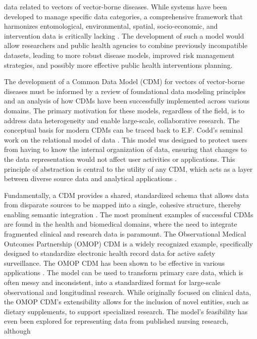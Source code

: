 \documentclass{article}
\begin{document}
data related to vectors of vector-borne diseases. While systems have been developed to manage specific data categories, a 
comprehensive framework that harmonizes entomological, environmental, spatial, socio-economic, and intervention data is 
critically lacking \citep{2025.RL.HMD}. The development of such a model would allow researchers and public health agencies 
to combine previously incompatible datasets, leading to more robust disease models, improved risk management strategies, and 
possibly more effective public health interventions planning.
\par
The development of a Common Data Model (CDM) for vectors of vector-borne diseases must be informed by a review of foundational 
data modeling principles and an analysis of how CDMs have been successfully implemented across various domains. The primary 
motivation for these models, regardless of the field, is to address data heterogeneity and enable large-scale, collaborative 
research. The conceptual basis for modern CDMs can be traced back to E.F. Codd's seminal work on the relational model of 
data \citep{1970.ED.ARM}. This model was designed to protect users from having to know the internal organization of data, 
ensuring that changes to the data representation would not affect user activities or applications. This principle of 
abstraction is central to the utility of any CDM, which acts as a layer between diverse source data and analytical 
applications \citep{2017.MD.ITD}.
\par
Fundamentally, a CDM provides a shared, standardized schema that allows data from disparate sources to be mapped into a single, 
cohesive structure, thereby enabling semantic integration \citep{2017.MD.ITD}. The most prominent examples of successful CDMs 
are found in the health and biomedical domains, where the need to integrate fragmented clinical and research data is paramount. 
The Observational Medical Outcomes Partnership (OMOP) CDM is a widely recognized example, specifically designed to standardize 
electronic health record data for active safety surveillance. The OMOP CDM has been shown to be effective in various applications 
\citep{2024.MF.TPC, 2023.AS.ACD}. The model can be used to transform primary care data, which is often messy and inconsistent, 
into a standardized format for large-scale observational and longitudinal research. While originally focused on clinical data, 
the OMOP CDM's extensibility allows for the inclusion of novel entities, such as dietary supplements, to support specialized 
research. The model's feasibility has even been explored for representing data from published nursing research, although 
\end{document}
